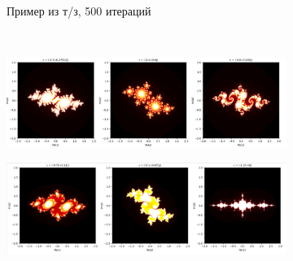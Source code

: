 \begin{figure}[H]
\begin{subfigure}{0.4\textwidth}
        \caption{Пример из т/з, 500 итераций }
    \end{subfigure}
    \\
    \caption{примеры при различных С, 100 итераций }
    \hspace{1.7cm}
    \begin{subfigure}{1\textwidth}
        \includegraphics[width=\textwidth]{plots/J5.png}
    \end{subfigure}
    \hspace{1.7cm}
    \begin{subfigure}{1\textwidth}
        \includegraphics[width=\textwidth]{plots/J6.png}
    \end{subfigure}
\end{figure}